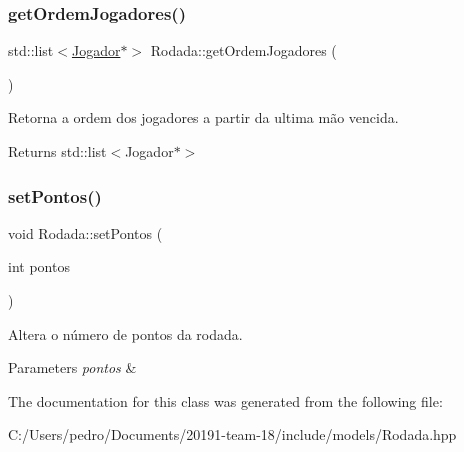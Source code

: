\subsubsection{\texorpdfstring{getOrdemJogadores()}{getOrdemJogadores()}}
{\footnotesize\ttfamily std\+::list$<$\mbox{\hyperlink{class_jogador}{Jogador}}$\ast$$>$ Rodada\+::get\+Ordem\+Jogadores (\begin{DoxyParamCaption}{ }\end{DoxyParamCaption})}



Retorna a ordem dos jogadores a partir da ultima mão vencida. 

\begin{DoxyReturn}{Returns}
std\+::list$<$\+Jogador$\ast$$>$ 
\end{DoxyReturn}
\mbox{\label{class_rodada_aa8ca4b5f5b62991292a33188a1004fd1}} 
\subsubsection{\texorpdfstring{setPontos()}{setPontos()}}
{\footnotesize\ttfamily void Rodada\+::set\+Pontos (\begin{DoxyParamCaption}\item[{int}]{pontos }\end{DoxyParamCaption})}



Altera o número de pontos da rodada. 


\begin{DoxyParams}{Parameters}
{\em pontos} & \\
\hline
\end{DoxyParams}


The documentation for this class was generated from the following file\+:\begin{DoxyCompactItemize}
\item 
C\+:/\+Users/pedro/\+Documents/20191-\/team-\/18/include/models/Rodada.\+hpp\end{DoxyCompactItemize}
